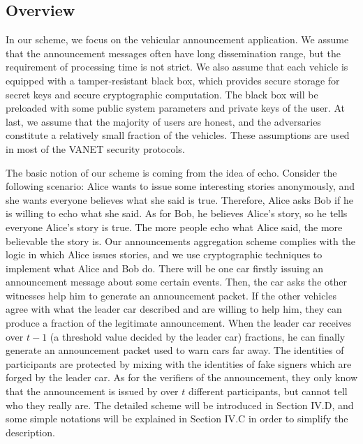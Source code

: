 \documentclass[a4paper]{article}
\begin{document}
\subsection{Overview}
In our scheme, we focus on the vehicular announcement application. We assume that the announcement messages often have long dissemination range, but the requirement of processing time is not strict. We also assume that each vehicle is equipped with a tamper-resistant black box, which provides secure storage for secret keys and secure cryptographic computation. The black box will be preloaded with some public system parameters and private keys of the user. At last, we assume that the majority of users are honest, and the adversaries constitute a relatively small fraction of the vehicles. These assumptions are used in most of the VANET security protocols.

The basic notion of our scheme is coming from the idea of echo. Consider the following scenario: Alice wants to issue some interesting stories anonymously, and she wants everyone believes what she said is true. Therefore, Alice asks Bob if he is willing to echo what she said. As for Bob, he believes Alice's story, so he tells everyone Alice's story is true. The more people echo what Alice said, the more believable the story is. Our announcements aggregation scheme complies with the logic in which Alice issues stories, and we use cryptographic techniques to implement what Alice and Bob do. There will be one car firstly issuing an announcement message about some certain events. Then, the car asks the other witnesses help him to generate an announcement packet. If the other vehicles agree with what the leader car described and are willing to help him, they can produce a fraction of the legitimate announcement. When the leader car receives over $t-1$ (a threshold value decided by the leader car) fractions, he can finally generate an announcement packet used to warn cars far away. The identities of participants are protected by mixing with the identities of fake signers which are forged by the leader car. As for the verifiers of the announcement, they only know that the announcement is issued by over $t$ different participants, but cannot tell who they really are. The detailed scheme will be introduced in Section IV.D, and some simple notations will be explained in Section IV.C in order to simplify the description.
\end{document}

